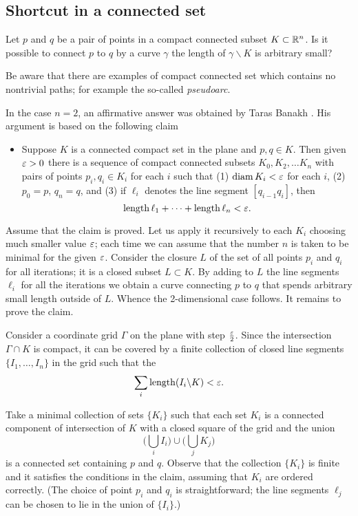 \subsection*{Shortcut in a connected set}

\begin{pr}
Let $p$ and $q$ be a pair of points in a compact connected subset $K\subset \mathbb{R}^n$.
Is it possible to connect $p$ to $q$ by a curve $\gamma$ the length of $\gamma\backslash K$ is arbitrary small?
\end{pr}

Be aware that there are examples of compact connected set which contains no nontrivial paths; for example the so-called \emph{pseudoarc}.

In the case $n=2$, an affirmative answer was obtained by Taras Banakh \cite{banakh}.
His argument is based on the following claim

\begin{itemize}
 \item Suppose $K$ is a connected compact set in the plane and $p,q\in K$.
 Then given $\varepsilon>0$ there is a sequence of compact connected subsets $K_0,K_2,\dots K_n$
 with pairs of points $p_i,q_i\in K_i$ for each $i$ such that 
(1) $\operatorname{\rm diam}\nolimits K_i<\varepsilon$ for each $i$,
(2) $p_0=p$, $q_n=q$, and (3) if $\ell_i$ denotes the line segment $[q_{i-1}q_i]$, then 
 \[\operatorname{\rm length} \ell_1+\dots+\operatorname{\rm length} \ell_n<\varepsilon.\]
\end{itemize}

Assume that the claim is proved.
Let us apply it recursively to each $K_i$ choosing much smaller value $\varepsilon$; each time we can assume that the number $n$ is taken to be minimal for the given $\varepsilon$.
Consider the closure $L$ of the set of all points $p_i$ and $q_i$ for all iterations; it is a closed subset $L\subset K$.
By adding to $L$ the line segments $\ell_i$ for all the iterations we obtain a curve connecting $p$ to $q$ that spends arbitrary small length outside of $L$.
Whence the 2-dimensional case follows.
It remains to prove the claim.

Consider a coordinate grid $\Gamma$ on the plane with step $\tfrac{\varepsilon}2$.
Since the intersection $\Gamma\cap K$ is compact, it can be covered by a finite collection of closed line segments $\{I_1,\dots,I_n\}$ in the grid such that the 
\[\sum_i\operatorname{\rm length}(I_i\backslash K)<\varepsilon.\]

Take a minimal collection of sets $\{K_i\}$ such that each set $K_i$ is a connected component of intersection of $K$ with a closed square of the grid and the union 
\[\biggl(\bigcup_i I_i\biggr)\cup\biggl(\bigcup_j K_j\biggr)\]
is a connected set containing $p$ and $q$. 
Observe that the collection $\{K_i\}$ is finite and it satisfies the conditions in the claim, assuming that $K_i$ are ordered correctly.
(The choice of point $p_i$ and $q_i$ is straightforward;
the line segments $\ell_j$ can be chosen to lie in the union of $\{I_i\}$.)


